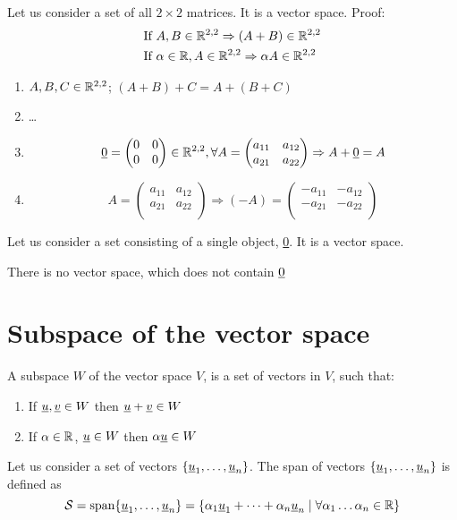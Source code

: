 \begin{example}
Let us consider a set of all $2\times 2$ matrices. It is a vector space. Proof:
\begin{align*}
&\text{If }A,B\in\mathbb{R}^{2,2}\Rightarrow (A+B)\in\mathbb{R}^{2,2}\\
&\text{If }\alpha\in\mathbb{R}, A\in\mathbb{R}^{2,2}\Rightarrow\alpha A \in \mathbb{R}^{2,2}
\end{align*}

\begin{enumerate}
\item $A,B,C\in\mathbb{R}^{2,2}$; $(A+B)+C = A+(B+C)$
\item \dots 
\item \[
\underline{0} = \begin{pmatrix}
0 & 0\\
0 & 0
\end{pmatrix}\in \mathbb{R}^{2,2}, \forall A = \begin{pmatrix}
a_{11} & a_{12}\\
a_{21} & a_{22}\\
\end{pmatrix} \Rightarrow A+\underline{0} = A
\]
\item \[
A = \begin{pmatrix}
a_{11} & a_{12}\\
a_{21} & a_{22}\\
\end{pmatrix}\Rightarrow (-A) = \begin{pmatrix}
-a_{11} & -a_{12}\\
-a_{21} & -a_{22}\\
\end{pmatrix}
\]
\end{enumerate}
\end{example}
\begin{example}
Let us consider a set consisting of a single object, \ul{0}. It is a vector space. 
\end{example}

\begin{note}
There is no vector space, which does not contain $\underline{0}$	
\end{note}


\section{Subspace of the vector space}
\begin{definition}
A subspace $W$ of the vector space $V$, is a set of vectors in $V$, such that:
\begin{enumerate}
	\item If $\underline{u},\underline{v}\in W$ then $\underline{u}+\underline{v}\in W$
\item If $\alpha \in\mathbb{R}$, $\underline{u}\in W$ then $\alpha \underline{u}\in W$
\end{enumerate}
\end{definition}
\begin{definition}
Let us consider a set of vectors $\{ \underline{u}_1,\dots,\underline{u}_n \}$. The span of vectors $\{ \underline{u}_1,\dots,\underline{u}_n \}$ is defined as
\[ \mathcal{S} = \text{span}\{\underline{u}_1,\dots,\underline{u}_n\} = \{\alpha_1\underline{u}_1+\dots+\alpha_n\underline{u}_n\mid \forall\alpha_1\dots\alpha_n\in\mathbb{R}\}\]
\end{definition}

